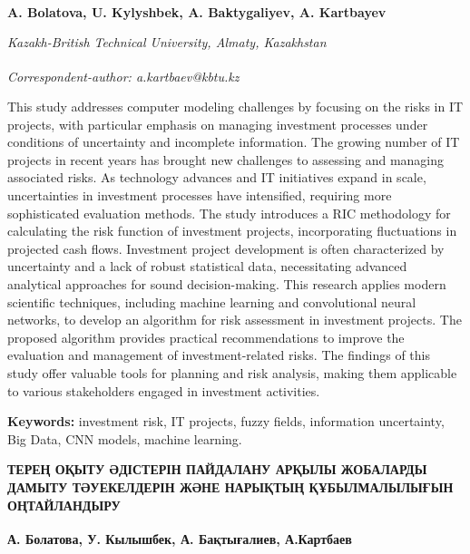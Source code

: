 
\begin{articleheader}

{\bfseries
A. Bolatova\authorid,
U. Kylyshbek\authorid,
A. Baktygaliyev\authorid,
A. Kartbayev\textsuperscript{\envelope } \authorid}
\end{articleheader}

\begin{affiliation}
\emph{Kazakh-British Technical University, Almaty, Kazakhstan}

\raggedright \textsuperscript{\envelope }{\em Correspondent-author: a.kartbaev@kbtu.kz}
\end{affiliation}

This study addresses computer modeling challenges by focusing on the
risks in IT projects, with particular emphasis on managing investment
processes under conditions of uncertainty and incomplete information.
The growing number of IT projects in recent years has brought new
challenges to assessing and managing associated risks. As technology
advances and IT initiatives expand in scale, uncertainties in investment
processes have intensified, requiring more sophisticated evaluation
methods. The study introduces a RIC methodology for calculating the risk
function of investment projects, incorporating fluctuations in projected
cash flows. Investment project development is often characterized by
uncertainty and a lack of robust statistical data, necessitating
advanced analytical approaches for sound decision-making. This research
applies modern scientific techniques, including machine learning and
convolutional neural networks, to develop an algorithm for risk
assessment in investment projects. The proposed algorithm provides
practical recommendations to improve the evaluation and management of
investment-related risks. The findings of this study offer valuable
tools for planning and risk analysis, making them applicable to various
stakeholders engaged in investment activities.

{\bfseries Keywords:} investment risk, IT projects, fuzzy fields,
information uncertainty, Big Data, CNN models, machine learning.

\begin{articleheader}
{\bfseries ТЕРЕҢ ОҚЫТУ ӘДІСТЕРІН ПАЙДАЛАНУ АРҚЫЛЫ ЖОБАЛАРДЫ ДАМЫТУ ТӘУЕКЕЛДЕРІН ЖӘНЕ НАРЫҚТЫҢ ҚҰБЫЛМАЛЫЛЫҒЫН ОҢТАЙЛАНДЫРУ}

{\bfseries
А. Болатова,
У. Кылышбек,
А. Бақтығалиев,
А.Картбаев\textsuperscript{\envelope }}
\end{articleheader}


